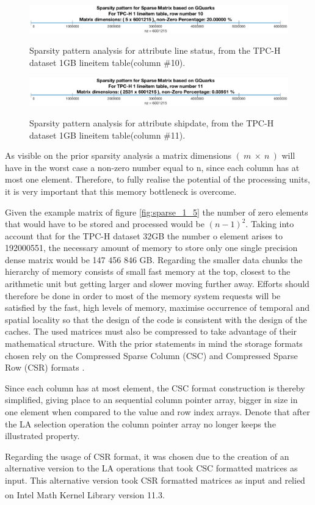 \begin{figure}[H]
\centering
\caption{Sparsity pattern analysis for attribute line status, from the TPC-H dataset 1GB lineitem table(column \#10).}
\includegraphics[width=1\columnwidth]{eps/sparsity_10.eps}
\label{fig:sparse_1_10}
\end{figure}

\begin{figure}[H]
\centering
\caption{Sparsity pattern analysis for attribute shipdate, from the TPC-H dataset 1GB lineitem table(column \#11).}
\includegraphics[width=1\columnwidth]{eps/sparsity_11.eps}
\label{fig:sparse_1_11}
\end{figure}

As visible on the prior sparsity analysis a matrix dimensions $(\ m\ \times\ n\ )$ will have in the worst case a non-zero number equal to n, since each column has at most one element. Therefore, to fully realise the potential of the processing units, it is very important that this memory bottleneck is overcome.\par 
 Given the example matrix of figure \ref{fig:sparse_1_5} the number of zero elements that would have to be stored and processed would be $(n-1)^2$. Taking into account that for the TPC-H dataset 32GB the number o element arises to 192000551, the necessary amount of memory to store only one single precision dense matrix would be  147 456 846 GB. Regarding the smaller data chunks 
 the hierarchy of memory consists of small fast memory at the top, closest to the arithmetic unit but getting larger and slower moving further away. Efforts should therefore be done in order to most of the memory system requests will be satisfied by the fast, high levels of memory, maximise occurrence of temporal and spatial locality so that the design of the code is consistent with the design of the caches. 
 The used matrices must also be compressed to take advantage of their mathematical structure. With the prior statements in mind the storage formats chosen  rely on the Compressed Sparse Column (CSC) and Compressed Sparse Row (CSR) formats \cite{silva2005sparse}. \par 
 Since each column has at most element, the CSC format construction is thereby simplified, giving place to an sequential column pointer array, bigger in size in one element when compared to the value and row index arrays. Denote that after the LA selection operation the column pointer array no longer keeps the illustrated property. \par 
Regarding the usage of CSR format, it was chosen due to the creation of an alternative version to the LA operations that took CSC formatted matrices as input. This alternative version took CSR formatted matrices as input and relied on  Intel\textsuperscript{\textregistered} Math Kernel Library version 11.3.



